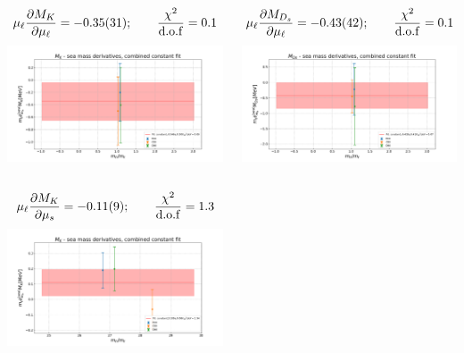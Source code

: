 \documentclass[xcolor={dvipsnames,table}]{beamer}
\begin{document}
\begin{frame}
    
   \begin{columns}
       \begin{column}{0.5\textwidth}
        {\small $$\mu_\ell \frac{\partial M_{K}}{\partial \mu_\ell} = -0.35(31); \qquad\frac{\chi^2}{\rm d.o.f}= 0.1$$}
        \includegraphics[trim=0cm 0.5cm 0cm 1.3cm, clip,width=\textwidth]{plots/const_fit_MK_der_ml.png}
        \vspace*{-0.8cm} \,\\
        {\small $$\mu_\ell \frac{\partial M_{K}}{\partial \mu_s} = -0.11(9); \qquad\frac{\chi^2}{\rm d.o.f}= 1.3$$}
        \includegraphics[trim=0cm 0.5cm 0cm 1.3cm, clip,width=\textwidth]{plots/const_fit_MK_der_ms.png}
       \end{column}
       \begin{column}{0.5\textwidth}
        {\small $$\mu_\ell \frac{\partial M_{D_s}}{\partial \mu_\ell} = -0.43(42); \qquad\frac{\chi^2}{\rm d.o.f}= 0.1$$}
        \includegraphics[trim=0cm 0.5cm 0cm 1.3cm, clip,width=\textwidth]{plots/const_fit_MD_der_ml.png}

\end{column}
\end{columns}
\end{frame}
\end{document}
